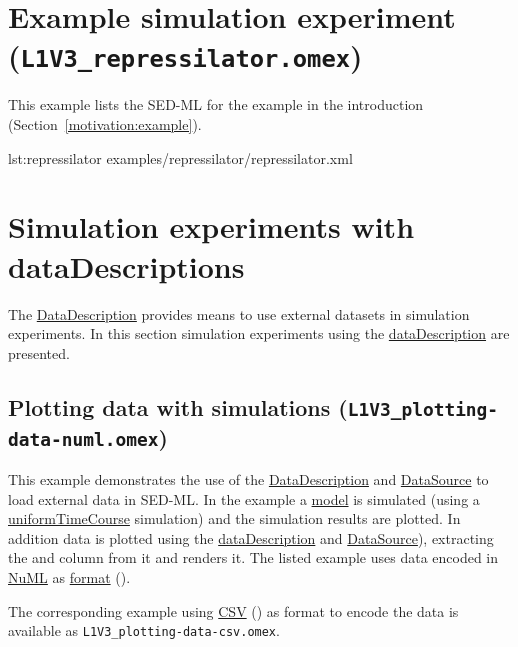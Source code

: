 \section{Example simulation experiment (\texttt{L1V3\_repressilator.omex})}
\label{example:repressilator}
This example lists the SED-ML for the example in the introduction (Section~\ref{motivation:example}).  

{lst:repressilator}
{examples/repressilator/repressilator.xml}

\pagebreak
\section{Simulation experiments with dataDescriptions}
The \hyperref[class:dataDescription]{DataDescription} provides means to use external datasets in simulation experiments. In this section simulation experiments using the \hyperref[class:dataDescription]{dataDescription} are presented.

\subsection{Plotting data with simulations (\texttt{L1V3\_plotting-data-numl.omex})}
This example demonstrates the use of the \hyperref[class:dataDescription]{DataDescription} and \hyperref[class:dataSource]{DataSource} to load external data in SED-ML. In the example a \hyperref[class:model]{model} is simulated (using a \hyperref[class:uniformTimeCourse]{uniformTimeCourse} simulation) and the simulation results are plotted. In addition data is plotted using the \hyperref[class:dataDescription]{dataDescription} and \hyperref[class:dataSource]{DataSource}), extracting the  and  column from it and renders it. The listed example uses data encoded in \hyperref[sec:dataFormatNUML]{NuML} as \hyperref[sec:dataFormatURI]{format} (). 

The corresponding example using \hyperref[sec:dataFormatCSV]{CSV} () as format to encode the data is available as \texttt{L1V3\_plotting-data-csv.omex}.

